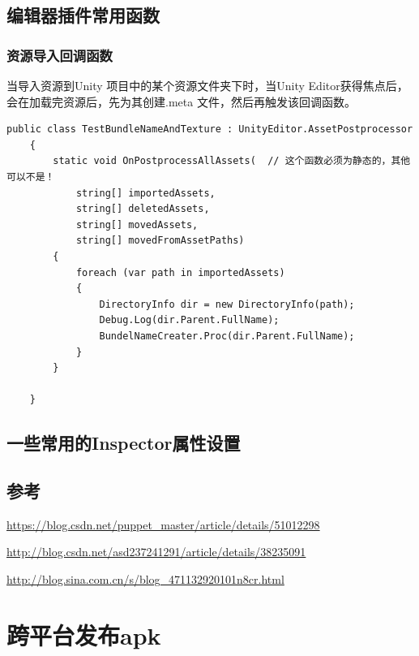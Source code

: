 \documentclass[UTF8,a4paper,12pt]{ctexbook}
\begin{document}
	
	
	\section{编辑器插件常用函数}
		\subsection{资源导入回调函数}
			当导入资源到Unity 项目中的某个资源文件夹下时，当Unity Editor获得焦点后，会在加载完资源后，先为其创建.meta 文件，然后再触发该回调函数。
			
			\begin{lstlisting}[frame=line]
	public class TestBundleNameAndTexture : UnityEditor.AssetPostprocessor
	{
	    static void OnPostprocessAllAssets(  // 这个函数必须为静态的，其他可以不是！
	        string[] importedAssets,
	        string[] deletedAssets,
	        string[] movedAssets,
	        string[] movedFromAssetPaths)
	    {
	        foreach (var path in importedAssets)
	        {
	            DirectoryInfo dir = new DirectoryInfo(path);
	            Debug.Log(dir.Parent.FullName);
	            BundelNameCreater.Proc(dir.Parent.FullName);
	        }
	    }
	
	}
			\end{lstlisting}
	\section{一些常用的Inspector属性设置}
	
	
	\section{参考}
		\url{https://blog.csdn.net/puppet_master/article/details/51012298}
		
		\url{http://blog.csdn.net/asd237241291/article/details/38235091}
		
		\url{http://blog.sina.com.cn/s/blog_471132920101n8cr.html}
		
\chapter{跨平台发布apk}
\end{document}
